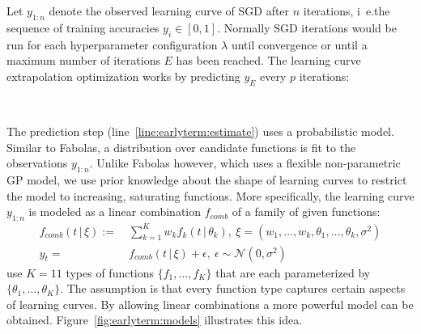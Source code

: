 Let \(y_{1:n}\) denote the observed learning curve of SGD after \(n\) iterations, i~e.\@ the sequence of training accuracies \(y_i \in [0, 1]\).
Normally SGD iterations would be run for each hyperparameter configuration \(\lambda\) until convergence or until a maximum number of iterations \(E\) has been reached.
The learning curve extrapolation optimization works by predicting \(y_E\) every \(p\) iterations:
\begin{algorithmic}[1]
	\Repeat\
		\State{\(n \gets n + p\)}
		\label{line:earlyterm:estimate}
\EndFor\
\end{algorithmic}
The prediction step (line~\ref{line:earlyterm:estimate}) uses a probabilistic model.
Similar to Fabolas, a distribution over candidate functions is fit to the observations \(y_{1:n}\).
Unlike Fabolas however, which uses a flexible non-parametric GP model, we use prior knowledge about the shape of learning curves to restrict the model to increasing, saturating functions.
More specifically, the learning curve \(y_{1:n}\) is modeled as a linear combination \(f_{\mathit{comb}}\) of a family of given functions:
\begin{align}
	f_{\mathit{comb}}(t\, |\, \xi) :=&\ \sum_{k = 1}^{K} w_k f_k(t\, |\, \theta_k),\
	\xi = (w_1, \dots, w_k, \theta_1, \dots, \theta_k, \sigma^2) \\
	y_t =&\ f_{\mathit{comb}}(t\, |\, \xi) + \epsilon,\ \epsilon \sim \mathcal{N}(0, \sigma^2)
\end{align}
\citet{Domhan2015} use \(K = 11\) types of functions \(\{f_1, \dots, f_K\}\) that are each parameterized by \(\{\theta_1, \dots, \theta_K\}\).
The assumption is that every function type captures certain aspects of learning curves.
By allowing linear combinations a more powerful model can be obtained.
Figure~\ref{fig:earlyterm:models} illustrates this idea.
